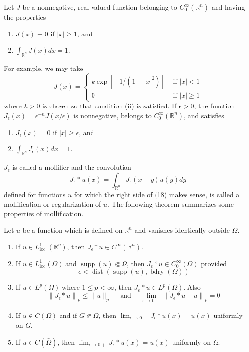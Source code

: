 \begin{para}[Mollifiers]
  Let $J$ be a nonnegative, real-valued function belonging to $C_0^{\infty}(\mathbb{R}^n)$ and having the properties
  \begin{enumerate}[label = (\roman*)]
    \item $J(x)=0$ if $|x| \geq 1$, and
    \item $\int_{\mathbb{R}^n} J(x) d x=1$.
  \end{enumerate}
  For example, we may take
  \[
  J(x)= \begin{cases}k \exp \left[-1 /\left(1-|x|^2\right)\right] & \text { if }|x|<1 \\ 0 & \text { if }|x| \geq 1\end{cases}
  \]
  where $k>0$ is chosen so that condition (ii) is satisfied. If $\epsilon>0$, the function $J_\epsilon(x)=\epsilon^{-n} J(x / \epsilon)$ is nonnegative, belongs to $C_0^{\infty}(\mathbb{R}^n)$, and satisfies
  \begin{enumerate}[label = (\roman*)]
    \item $J_\epsilon(x)=0$ if $|x| \geq \epsilon$, and
    \item $\int_{\mathbb{R}^n} J_\epsilon(x) d x=1$.
  \end{enumerate}
  $J_\epsilon$ is called a mollifier and the convolution
  \[
  J_\epsilon * u(x)=\int_{\mathbb{R}^n} J_\epsilon(x-y) u(y) d y
  \]
  defined for functions $u$ for which the right side of (18) makes sense, is called
  a mollification or regularization of $u$. The following theorem summarizes some properties of mollification.
\end{para}

\begin{theorem}
  Let $u$ be a function which is defined on $\mathbb{R}^n$ and vanishes identically outside $\Omega$.
  \begin{enumerate}[label = (\alph*)]
    \item If $u \in L_{\text {loc }}^1(\mathbb{R}^n)$, then $J_\epsilon * u \in C^{\infty}(\mathbb{R}^n)$.
    \item If $u \in L_{\mathrm{loc}}^1(\Omega)$ and $\operatorname{supp}(u) \Subset \Omega$, then $J_\epsilon * u \in C_0^{\infty}(\Omega)$ provided
    \[
    \epsilon<\operatorname{dist}(\operatorname{supp}(u), \operatorname{bdry}(\Omega))
    \]
    \item If $u \in L^p(\Omega)$ where $1 \leq p<\infty$, then $J_\epsilon * u \in L^p(\Omega)$. Also
    \[
    \left\|J_\epsilon * u\right\|_p \leq\|u\|_p \quad \text { and } \quad \lim _{\epsilon \rightarrow 0+}\left\|J_\epsilon * u-u\right\|_p=0
    \]
    \item If $u \in C(\Omega)$ and if $G \Subset \Omega$, then $\lim _{\epsilon \rightarrow 0+} J_\epsilon * u(x)=u(x)$ uniformly on $G$.
    \item If $u \in C(\bar{\Omega})$, then $\lim _{\epsilon \rightarrow 0+} J_\epsilon * u(x)=u(x)$ uniformly on $\Omega$.
  \end{enumerate}
\end{theorem}

